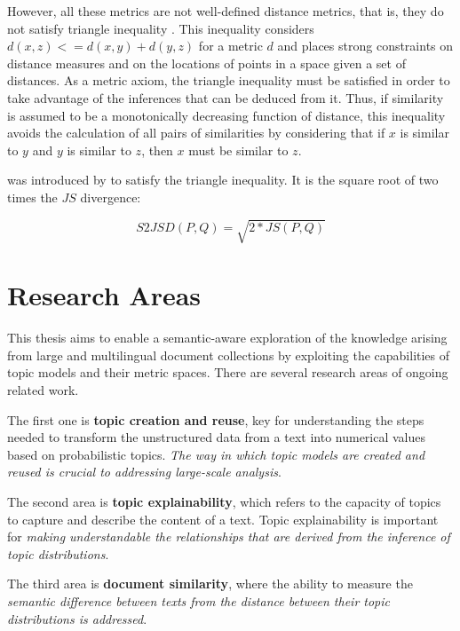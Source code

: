 However, all these metrics are not well-defined distance metrics, that is, they do not satisfy triangle inequality \citep{Charikar2002}. This inequality considers $d(x, z) <= d(x, y) + d(y, z)$ for a metric $d$ \citep{Griffiths2007} and places strong constraints on distance measures and on the locations of points in a space given a set of distances. As a metric axiom, the triangle inequality must be satisfied in order to take advantage of the inferences that can be deduced from it. Thus, if similarity is assumed to be a monotonically decreasing function of distance, this inequality avoids the calculation of all pairs of similarities by considering that if $x$ is similar to $y$ and $y$ is similar to $z$, then $x$ must be similar to $z$. 

 was introduced by \citep{Endres2003} to satisfy the triangle inequality. It is the square root of two times the $JS$ divergence:

\begin{equation}
    S2JSD(P,Q) = \sqrt{2*JS(P,Q)}
\label{eq:s2jsd}
\end{equation}

\section{Research Areas}
\label{sec:research-topic}

This thesis aims to enable a semantic-aware exploration of the knowledge arising from large and multilingual document collections by exploiting the capabilities of topic models and their metric spaces. There are several research areas of ongoing related work. 

The first one is \textbf{topic creation and reuse}, key for understanding the steps needed to transform the unstructured data from a text into numerical values based on probabilistic topics. \textit{The way in which topic models are created and reused is crucial to addressing large-scale analysis}. 

The second area is \textbf{topic explainability}, which refers to the capacity of topics to capture and describe the content of a text. Topic explainability is important for \textit{making understandable the relationships that are derived from the inference of topic distributions}. 

The third area is \textbf{document similarity}, where the ability to measure the \textit{semantic difference between texts from the distance between their topic distributions is addressed}. 

